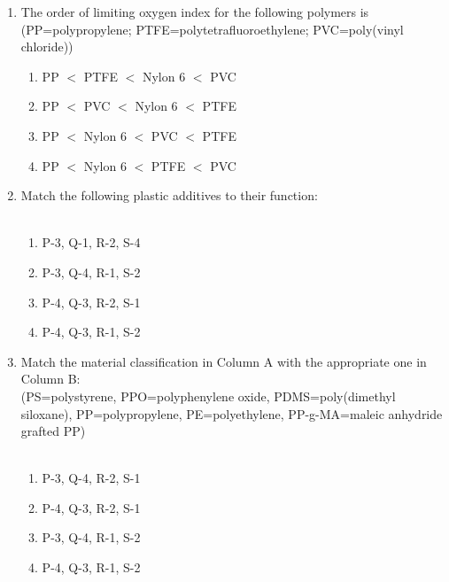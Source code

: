 \documentclass[journal,12pt,onecolumn]{IEEEtran}
\begin{document}
\begin{enumerate}[label=\arabic*)]
\item The order of limiting oxygen index for the following polymers is (PP=polypropylene; PTFE=polytetrafluoroethylene; PVC=poly(vinyl chloride))
\hfill{} \\

\vspace{0.2cm}
\begin{enumerate}[label=\alph*)]
\item PP $<$ PTFE $<$ Nylon 6 $<$ PVC
\item PP $<$ PVC $<$ Nylon 6 $<$ PTFE
\item PP $<$ Nylon 6 $<$ PVC $<$ PTFE
\item PP $<$ Nylon 6 $<$ PTFE $<$ PVC
\end{enumerate}

\newpage

\item Match the following plastic additives to their function:\\



\hfill{} \\

\vspace{0.2cm}
\begin{enumerate}[label=\alph*)]
\item P-3, Q-1, R-2, S-4
\item P-3, Q-4, R-1, S-2
\item P-4, Q-3, R-2, S-1
\item P-4, Q-3, R-1, S-2
\end{enumerate}

\vspace{0.5cm}

\item Match the material classification in Column A with the appropriate one in Column B:\\
(PS=polystyrene, PPO=polyphenylene oxide, PDMS=poly(dimethyl siloxane), PP=polypropylene, PE=polyethylene, PP-g-MA=maleic anhydride grafted PP)\\



\hfill{} \\

\vspace{0.2cm}
\begin{enumerate}[label=\alph*)]
\item P-3, Q-4, R-2, S-1
\item P-4, Q-3, R-2, S-1
\item P-3, Q-4, R-1, S-2
\item P-4, Q-3, R-1, S-2
\end{enumerate}


\end{enumerate}
\end{document}
